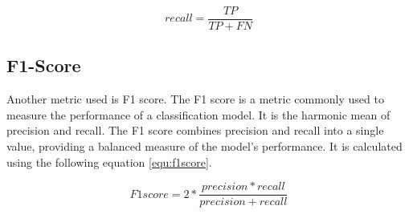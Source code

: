 \begin{equation}
    \label{equ:recall}
    recall=\frac{TP}{TP+FN}
\end{equation}

\subsection{F1-Score}
\label{subsec3: f1score}
Another metric used is F1 score. The F1 score is a metric commonly used to measure the performance of a classification model. It is the harmonic mean of precision and recall. The F1 score combines precision and recall into a single value, providing a balanced measure of the model's performance. It is calculated using the following equation \ref{equ:f1score}.

\begin{equation}
    \label{equ:f1score}
    F1 score = 2 * \frac{precision * recall}{precision + recall}
\end{equation}
